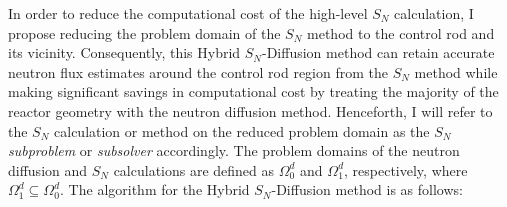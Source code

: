 In order to reduce the computational cost of the high-level $S_N$ calculation, I propose reducing
the problem domain of the $S_N$ method to the control rod and its vicinity. Consequently, this
Hybrid $S_N$-Diffusion method can retain accurate neutron flux estimates around the control rod
region from the $S_N$ method while making significant savings in computational cost by treating the
majority of the reactor geometry with the neutron diffusion method. Henceforth, I will refer to
the $S_N$ calculation or method on the reduced problem domain as the $S_N$ \textit{subproblem} or
\textit{subsolver} accordingly. The problem domains of the neutron diffusion and $S_N$ calculations
are defined as $\Omega^d_0$ and $\Omega^d_1$, respectively, where $\Omega^d_1 \subseteq
\Omega^d_0$. The algorithm for the Hybrid $S_N$-Diffusion method is as follows:
%
%
